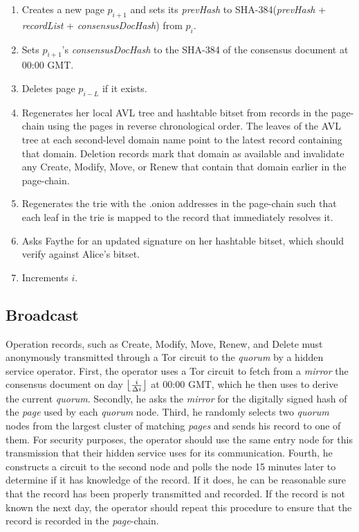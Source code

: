 \begin{enumerate}
	\item Creates a new page $ p_{i + 1} $ and sets its \emph{prevHash} to SHA-384(\emph{prevHash} + \emph{recordList} + \emph{consensusDocHash}) from $ p_{i} $.
	\item Sets $ p_{i + 1} $'s \emph{consensusDocHash} to the SHA-384 of the consensus document at 00:00 GMT.
	\item Deletes page $ p_{i - L} $ if it exists.
	\item Regenerates her local AVL tree and hashtable bitset from records in the page-chain using the pages in reverse chronological order. The leaves of the AVL tree at each second-level domain name point to the latest record containing that domain. Deletion records mark that domain as available and invalidate any Create, Modify, Move, or Renew that contain that domain earlier in the page-chain.
	\item Regenerates the trie with the .onion addresses in the page-chain such that each leaf in the trie is mapped to the record that immediately resolves it.
	\item Asks Faythe for an updated signature on her hashtable bitset, which should verify against Alice's bitset.
	\item Increments $ i $.
\end{enumerate}

\subsection{Broadcast}


Operation records, such as Create, Modify, Move, Renew, and Delete must anonymously transmitted through a Tor circuit to the \emph{quorum} by a hidden service operator. First, the operator uses a Tor circuit to fetch from a \emph{mirror} the consensus document on day $ \floor[\big]{\frac{i}{\Delta i}} $ at 00:00 GMT, which he then uses to derive the current \emph{quorum}. Secondly, he asks the \emph{mirror} for the digitally signed hash of the \emph{page} used by each \emph{quorum} node. Third, he randomly selects two \emph{quorum} nodes from the largest cluster of matching \emph{pages} and sends his record to one of them. For security purposes, the operator should use the same entry node for this transmission that their hidden service uses for its communication. Fourth, he constructs a circuit to the second node and polls the node 15 minutes later to determine if it has knowledge of the record. If it does, he can be reasonable sure that the record has been properly transmitted and recorded. If the record is not known the next day, the operator should repeat this procedure to ensure that the record is recorded in the \emph{page}-chain.

